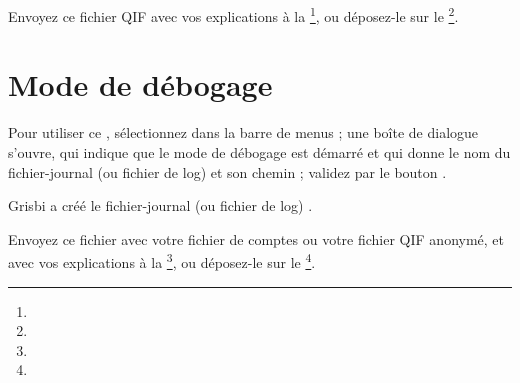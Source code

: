 Envoyez ce fichier QIF avec vos explications à la \footnote{\urlListBugsreport{}}, ou déposez-le sur le  \footnote{\urlTuxFamilyMantis{}}.


\section{Mode de débogage\label{maintenance-debug-mode}}


Pour utiliser ce , sélectionnez  dans la barre de menus ;  une boîte de dialogue s'ouvre, qui indique que le mode de débogage est démarré et qui donne le nom du fichier-journal (ou fichier de log) et son chemin ; validez par le bouton .

Grisbi a créé le fichier-journal (ou fichier de log) .

Envoyez ce fichier avec votre fichier de comptes ou votre fichier QIF anonymé, et avec vos explications à la \footnote{\urlListBugsreport{}}, ou déposez-le sur le  \footnote{\urlTuxFamilyMantis{}}.


